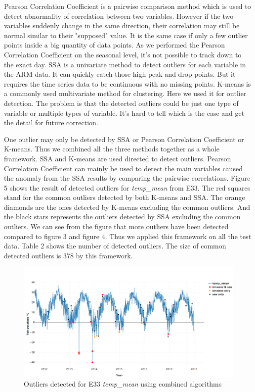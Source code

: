 \documentclass[letterpaper, 10 pt, conference]{ieeeconf}  %
\begin{document}
Pearson Correlation Coefficient is a pairwise comparison method which is used to detect abnormality of correlation between two variables. However if the two variables suddenly change in the same direction, their correlation may still be normal similar to their "supposed" value. It is the same case if only a few outlier points inside a big quantity of data points. As we performed the Pearson Correlation Coefficient on the seasonal level, it's not possible to track down to the exact day. SSA is a univariate method to detect outliers for each variable in the ARM data. It can quickly catch those high peak and drop points. But it requires the time series data to be continuous with no missing points. K-means is a commonly used multivariate method for clustering. Here we used it for outlier detection. The problem is that the detected outliers could be just one type of variable or multiple types of variable. It's hard to tell which is the case and get the detail for future correction.

One outlier may only be detected by SSA or Pearson Correlation Coefficient or K-means. Thus we combined all the three methods together as a whole framework. SSA and K-means are used directed to detect outliers. Pearson Correlation Coefficient can mainly be used to detect the main variables caused the anomaly from the SSA results by comparing the pairwise correlations. Figure 5 shows the result of detected outliers for \textit{temp\_mean} from E33. The red squares stand for the common outliers detected by both K-means and SSA. The orange diamonds are the ones detected by K-means excluding the common outliers. And the black stars represents the outliers detected by SSA excluding the common outliers. We can see from the figure that more outliers have been detected compared to figure 3 and figure 4. Thus we applied this framework on all the test data. Table 2 shows the number of detected outliers. The size of common detected outliers is 378 by this framework.

\begin{figure}[ht]
    \centering
    \includegraphics[width=\textwidth]{combined.png}
    \caption{Outliers detected for E33 \textit{temp\_mean} using combined algorithms}
    \label{fig:combined}
\end{figure}
\end{document}
